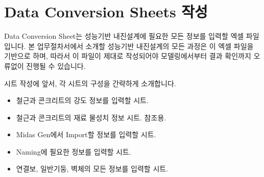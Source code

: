\documentclass[a4paper,11pt,korean,openany,oneside]{sphinxmanual}
\begin{document}
\sphinxstepscope


\chapter{Data Conversion Sheets 작성}
\label{\detokenize{2_data_conv_sheets:data-conversion-sheets}}\label{\detokenize{2_data_conv_sheets::doc}}
\sphinxAtStartPar
Data Conversion Sheet는 성능기반 내진설계에 필요한 모든 정보를 입력할 엑셀 파일입니다.
본 업무절차서에서 소개할 성능기반 내진설계의 모든 과정은 이 엑셀 파일을 기반으로 하며,
따라서 이 파일이 제대로 작성되어야 모델링에서부터 결과 확인까지 오류없이 진행될 수 있습니다.

\sphinxAtStartPar
시트 작성에 앞서, 각 시트의 구성을 간략하게 소개합니다.
\begin{itemize}
\item {} \begin{description}
\sphinxAtStartPar
철근과 콘크리트의 강도 정보를 입력할 시트.

\end{description}

\item {} \begin{description}
\sphinxAtStartPar
철근과 콘크리트의 재료 물성치 정보 시트. 참조용.

\end{description}

\item {} \begin{description}
\sphinxAtStartPar
Midas Gen에서 Import할 정보를 입력할 시트.

\end{description}

\item {} \begin{description}
\sphinxAtStartPar
Naming에 필요한 정보를 입력할 시트.

\end{description}

\item {} \begin{description}
\sphinxAtStartPar
연결보, 일반기둥, 벽체의 모든 정보를 입력할 시트.


\end{description}
\end{itemize}
\end{document}
